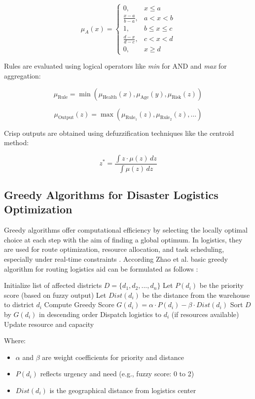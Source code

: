 \documentclass[conference,final,a4paper,twoside,10pt]{IEEEtran}
\begin{document}
\[
\mu_A(x) = 
\begin{cases}
0, & x \leq a \\
\frac{x - a}{b - a}, & a < x < b \\
1, & b \leq x \leq c \\
\frac{d - x}{d - c}, & c < x < d \\
0, & x \geq d
\end{cases}
\]

Rules are evaluated using logical operators like \textit{min} for AND and \textit{max} for aggregation:

\[
\mu_{\text{Rule}} = \min\left( \mu_{\text{Health}}(x), \mu_{\text{Age}}(y), \mu_{\text{Risk}}(z) \right)
\]

\[
\mu_{\text{Output}}(z) = \max \left( \mu_{\text{Rule}_1}(z), \mu_{\text{Rule}_2}(z),\dots \right)
\]

Crisp outputs are obtained using defuzzification techniques like the centroid method:

\[
z^* = \frac{\int z \cdot \mu(z) \, dz}{\int \mu(z) \, dz}
\]

\subsection{Greedy Algorithms for Disaster Logistics Optimization}
Greedy algorithms offer computational efficiency by selecting the locally optimal choice at each step with the aim of finding a global optimum. In logistics, they are used for route optimization, resource allocation, and task scheduling, especially under real-time constraints \cite{garcia2025greedy}.
According Zhao et al. basic greedy algorithm for routing logistics aid can be formulated as follows \cite{zhao2021iterated}:

\begin{algorithmic}
\STATE Initialize list of affected districts $D = \{d_1, d_2, ..., d_n\}$
\STATE Let $P(d_i)$ be the priority score (based on fuzzy output)
\STATE Let $Dist(d_i)$ be the distance from the warehouse to district $d_i$
\STATE Compute Greedy Score $G(d_i) = \alpha \cdot P(d_i) - \beta \cdot Dist(d_i)$
\STATE Sort $D$ by $G(d_i)$ in descending order
    \STATE Dispatch logistics to $d_i$ (if resources available)
    \STATE Update resource and capacity
\ENDFOR
\end{algorithmic}

Where:
\begin{itemize}
    \item $\alpha$ and $\beta$ are weight coefficients for priority and distance
    \item $P(d_i)$ reflects urgency and need (e.g., fuzzy score: 0 to 2)
    \item $Dist(d_i)$ is the geographical distance from logistics center
\end{itemize}
\end{document}
